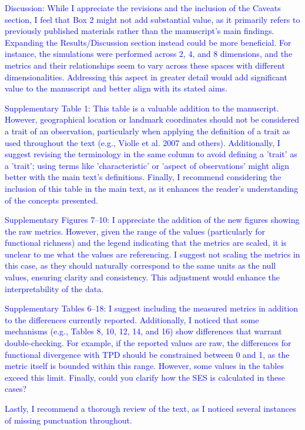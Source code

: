\documentclass[
]{article}
\begin{document}
\textcolor{blue}{Discussion: While I appreciate the revisions and the inclusion of the Caveats section, I feel that Box 2 might not add substantial value, as it primarily refers to previously published materials rather than the manuscript's main findings. Expanding the Results/Discussion section instead could be more beneficial. For instance, the simulations were performed across 2, 4, and 8 dimensions, and the metrics and their relationships seem to vary across these spaces with different dimensionalities. Addressing this aspect in greater detail would add significant value to the manuscript and better align with its stated aims.}

\textcolor{blue}{Supplementary Table 1: This table is a valuable addition to the manuscript. However, geographical location or landmark coordinates should not be considered a trait of an observation, particularly when applying the definition of a trait as used throughout the text (e.g., Violle et al. 2007 and others). Additionally, I suggest revising the terminology in the same column to avoid defining a 'trait' as a 'trait'; using terms like 'characteristic' or 'aspect of observations' might align better with the main text's definitions. Finally, I recommend considering the inclusion of this table in the main text, as it enhances the reader's understanding of the concepts presented.}

\textcolor{blue}{Supplementary Figures 7–10: I appreciate the addition of the new figures showing the raw metrics. However, given the range of the values (particularly for functional richness) and the legend indicating that the metrics are scaled, it is unclear to me what the values are referencing. I suggest not scaling the metrics in this case, as they should naturally correspond to the same units as the null values, ensuring clarity and consistency. This adjustment would enhance the interpretability of the data.}

\textcolor{blue}{Supplementary Tables 6–18: I suggest including the measured metrics in addition to the differences currently reported. Additionally, I noticed that some mechanisms (e.g., Tables 8, 10, 12, 14, and 16) show differences that warrant double-checking. For example, if the reported values are raw, the differences for functional divergence with TPD should be constrained between 0 and 1, as the metric itself is bounded within this range. However, some values in the tables exceed this limit. Finally, could you clarify how the SES is calculated in these cases?}

\textcolor{blue}{Lastly, I recommend a thorough review of the text, as I noticed several instances of missing punctuation throughout.}
\end{document}
